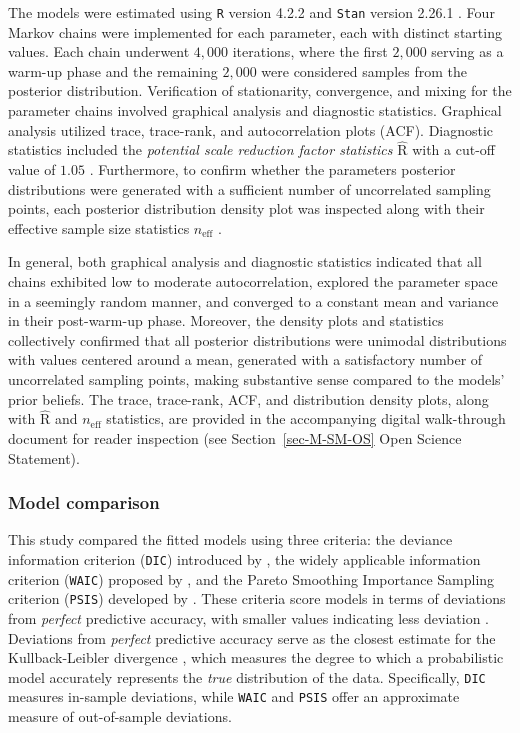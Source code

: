 \documentclass[
  authoryear,
  preprint,
  1p]{elsarticle}
\begin{document}
The models were estimated using \texttt{R} version 4.2.2 \citep{R_2015}
and \texttt{Stan} version 2.26.1 \citep{Stan_2020}. Four Markov chains
were implemented for each parameter, each with distinct starting values.
Each chain underwent \(4,000\) iterations, where the first \(2,000\)
serving as a warm-up phase and the remaining \(2,000\) were considered
samples from the posterior distribution. Verification of stationarity,
convergence, and mixing for the parameter chains involved graphical
analysis and diagnostic statistics. Graphical analysis utilized trace,
trace-rank, and autocorrelation plots (ACF). Diagnostic statistics
included the \emph{potential scale reduction factor statistics}
\(\widehat{\text{R}}\) with a cut-off value of \(1.05\)
\citep{Vehtari_et_al_2021}. Furthermore, to confirm whether the
parameters posterior distributions were generated with a sufficient
number of uncorrelated sampling points, each posterior distribution
density plot was inspected along with their effective sample size
statistics \(n_{\text{eff}}\) \citep{Gelman_et_al_2014}.

In general, both graphical analysis and diagnostic statistics indicated
that all chains exhibited low to moderate autocorrelation, explored the
parameter space in a seemingly random manner, and converged to a
constant mean and variance in their post-warm-up phase. Moreover, the
density plots and statistics collectively confirmed that all posterior
distributions were unimodal distributions with values centered around a
mean, generated with a satisfactory number of uncorrelated sampling
points, making substantive sense compared to the models' prior beliefs.
The trace, trace-rank, ACF, and distribution density plots, along with
\(\widehat{\text{R}}\) and \(n_{\text{eff}}\) statistics, are provided
in the accompanying digital walk-through document for reader inspection
(see Section~\ref{sec-M-SM-OS} Open Science Statement).

\subsubsection{Model comparison}\label{sec-M-SM-MC}

This study compared the fitted models using three criteria: the deviance
information criterion (\texttt{DIC}) introduced by
\citet{Spiegelhalter_et_al_2002}, the widely applicable information
criterion (\texttt{WAIC}) proposed by \citet{Watanabe_2013}, and the
Pareto Smoothing Importance Sampling criterion (\texttt{PSIS}) developed
by \citet{Vehtari_et_al_2017}. These criteria score models in terms of
deviations from \emph{perfect} predictive accuracy, with smaller values
indicating less deviation \citep{McElreath_2020}. Deviations from
\emph{perfect} predictive accuracy serve as the closest estimate for the
Kullback-Leibler divergence \citep{Kullback_et_al_1951}, which measures
the degree to which a probabilistic model accurately represents the
\emph{true} distribution of the data. Specifically, \texttt{DIC}
measures in-sample deviations, while \texttt{WAIC} and \texttt{PSIS}
offer an approximate measure of out-of-sample deviations.
\end{document}
